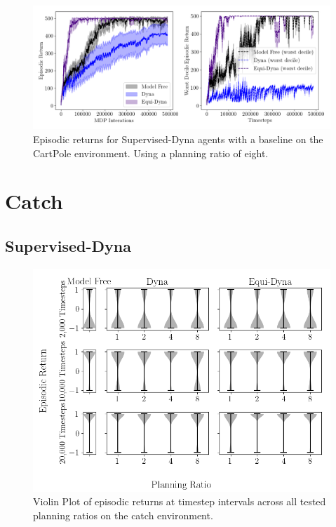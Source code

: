 \begin{figure}[h!]
	\centering
	\includegraphics[width=\textwidth]{Figures/Expert_dyna_cp_pr8.png}
	\caption{Episodic returns for Supervised-Dyna agents with a baseline on the CartPole environment. Using a planning ratio of eight.}
\end{figure}

\newpage

\section{Catch}



\subsection{Supervised-Dyna}\label{ap:supervised-dyna-catch}

\begin{figure}[h!]
	\centering
	\includegraphics[width=\textwidth]{Figures/violin_catch_expert.png}
	\caption{Violin Plot of episodic returns at timestep intervals across all tested planning ratios on the catch environment.}
\end{figure}

